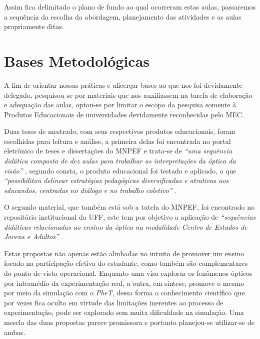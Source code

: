 Assim fica delimitado o plano de fundo ao qual ocorreram estas aulas, passaremos a sequência da escolha da abordagem, planejamento das atividades e as aulas propriamente ditas.

\section{Bases Metodológicas}
A fim de orientar nossas práticas e alicerçar bases ao que nos foi devidamente delegado, pesquisou-se por materiais que nos auxiliassem na tarefa de elaboração e adequação das aulas, optou-se por limitar o escopo da pesquisa somente à Produtos Educacionais de universidades devidamente reconhecidas pelo \ac{MEC}.

Duas teses de mestrado, com seus respectivos produtos educacionais, foram escolhidas para leitura e análise, a primeira delas foi encontrada no portal eletrônico de teses e dissertações do \ac{MNPEF} e trata-se de \emph{``uma sequência didática composta de dez aulas para trabalhar as interpretações da óptica da visão''} \cite{JAQUELINE:2019}, segundo consta, o produto educacional foi testado e aplicado, o que \emph{``possibilitou delinear estratégias pedagógicas diversificadas e atrativas aos educandos, centradas no diálogo e no trabalho coletivo''} . 

O segundo material, que também está sob a tutela do \ac{MNPEF}, foi encontrado no repositório institucional da \ac{UFF}, este tem por objetivo a aplicação de \emph{``sequências didáticas relacionadas ao ensino da óptica na modalidade Centro de
Estudos de Jovens e Adultos''} \cite{AGNALDO:2018}.

Estas propostas não apenas estão alinhadas no intuito de promover um ensino focado na participação efetiva do estudante, como também são complementares do ponto de vista operacional. Enquanto uma visa explorar os fenômenos ópticos por intermédio da experimentação real, a outra, em síntese, promove o mesmo por meio da simulação com o \emph{PheT}, dessa forma o conhecimento científico que por vezes fica oculto em virtude das limitações inerentes ao processo de experimentação, pode ser explorado sem muita dificuldade na simulação. Uma mescla das duas propostas parece promissora e portanto planejou-se utilizar-se de ambas.

